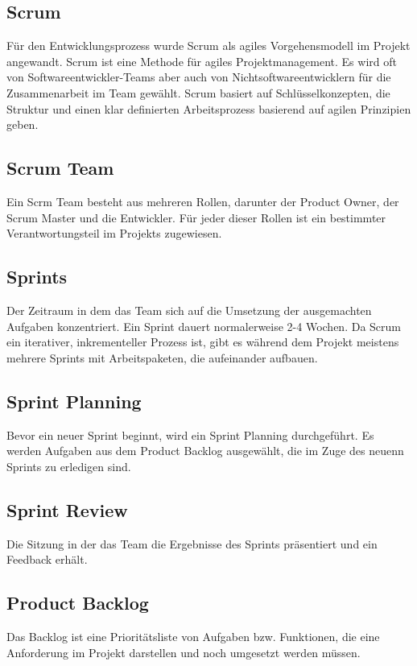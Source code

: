 \subsection{Scrum}
Für den Entwicklungsprozess wurde Scrum als agiles Vorgehensmodell im Projekt angewandt.
Scrum ist eine Methode für agiles Projektmanagement. Es wird 
oft von Softwareentwickler-Teams aber auch von Nichtsoftwareentwicklern
für die Zusammenarbeit im Team gewählt. Scrum basiert auf
Schlüsselkonzepten, die Struktur und einen klar definierten Arbeitsprozess basierend auf agilen Prinzipien geben.
\\

\subsection*{Scrum Team}
Ein Scrm Team besteht aus mehreren Rollen, darunter der Product Owner,
der Scrum Master und die Entwickler. Für jeder dieser Rollen ist ein 
bestimmter Verantwortungsteil im Projekts zugewiesen.

\subsection*{Sprints}
Der Zeitraum in dem das Team sich auf die Umsetzung der ausgemachten
Aufgaben konzentriert. Ein Sprint dauert normalerweise 2-4 Wochen.
Da Scrum ein iterativer, inkrementeller Prozess ist, gibt es während 
dem Projekt meistens mehrere Sprints mit Arbeitspaketen, die aufeinander aufbauen. 

\subsection*{Sprint Planning}
Bevor ein neuer Sprint beginnt, wird ein Sprint Planning durchgeführt.
Es werden Aufgaben aus dem Product Backlog ausgewählt, die im Zuge 
des neuenn Sprints zu erledigen sind.

\subsection*{Sprint Review}
Die Sitzung in der das Team die Ergebnisse des Sprints präsentiert und 
ein Feedback erhält.

\subsection*{Product Backlog}
Das Backlog ist eine Prioritätsliste von Aufgaben bzw. Funktionen,
die eine Anforderung im Projekt darstellen und noch umgesetzt werden müssen.


